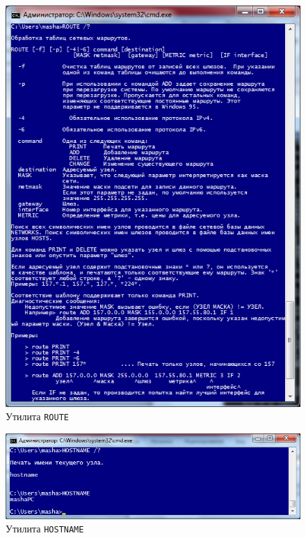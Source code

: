 \begin{figure}[h!]
  \centering
  \includegraphics[width=1\linewidth]{pic/route}
  \caption{Утилита \texttt{ROUTE}}
  \label{pic:route}
\end{figure}

\newpage

\begin{figure}[h!]
  \centering
  \includegraphics[width=0.8\linewidth]{pic/hostname}
  \caption{Утилита \texttt{HOSTNAME}}
  \label{pic:hostname}
\end{figure}

